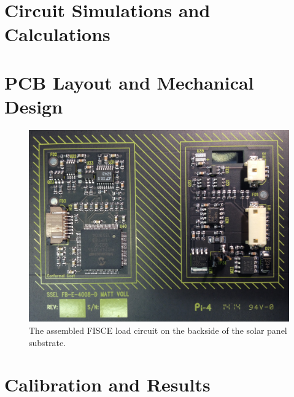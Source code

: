 \section{Circuit Simulations and Calculations}\label{Sect:test}



\section{PCB Layout and Mechanical Design}\label{Sect:test}

\begin{figure}[htbp]
	\centering
	\includegraphics[width=\textwidth]{../figs/fisce/manufacturing/fisce_assembled.jpg}
	\caption{The assembled FISCE load circuit on the backside of the solar panel substrate.}
	\label{fig:photo}
\end{figure}

\section{Calibration and Results}\label{Sect:test}
